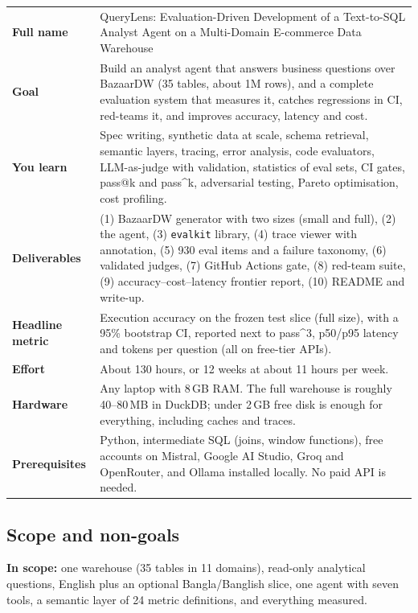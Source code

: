 \documentclass[11pt,a4paper]{article}
\newcommand{\code}[1]{\texttt{\small #1}}
\begin{document}
\begin{center}
\begin{tabularx}{\linewidth}{@{}>{\bfseries}l X@{}}
\toprule
Full name & QueryLens: Evaluation-Driven Development of a Text-to-SQL Analyst Agent on a
Multi-Domain E-commerce Data Warehouse\\
Goal & Build an analyst agent that answers business questions over BazaarDW (35 tables,
about 1M rows), and a complete evaluation system that measures it, catches regressions in CI,
red-teams it, and improves accuracy, latency and cost.\\
You learn & Spec writing, synthetic data at scale, schema retrieval, semantic layers, tracing,
error analysis, code evaluators, LLM-as-judge with validation, statistics of eval sets, CI gates,
pass@k and pass\^{}k, adversarial testing, Pareto optimisation, cost profiling.\\
Deliverables & (1) BazaarDW generator with two sizes (small and full), (2) the agent, (3) \code{evalkit}
library, (4) trace viewer with annotation, (5) 930 eval items and a failure taxonomy,
(6) validated judges, (7) GitHub Actions gate, (8) red-team suite, (9) accuracy--cost--latency
frontier report, (10) README and write-up.\\
Headline metric & Execution accuracy on the frozen test slice (full size), with a 95\% bootstrap CI,
reported next to pass\^{}3, p50/p95 latency and tokens per question (all on free-tier APIs).\\
Effort & About 130 hours, or 12 weeks at about 11 hours per week.\\
Hardware & Any laptop with 8\,GB RAM. The full warehouse is roughly 40--80\,MB in DuckDB; under 2\,GB free disk is enough for everything, including caches and traces.\\
Prerequisites & Python, intermediate SQL (joins, window functions), free accounts on Mistral, Google AI Studio, Groq and OpenRouter, and Ollama installed locally. No paid API is needed.\\
\bottomrule
\end{tabularx}
\end{center}

\subsection{Scope and non-goals}

\textbf{In scope:} one warehouse (35 tables in 11 domains), read-only analytical questions,
English plus an optional Bangla/Banglish slice, one agent with seven tools, a semantic layer
of 24 metric definitions, and everything measured.
\end{document}
